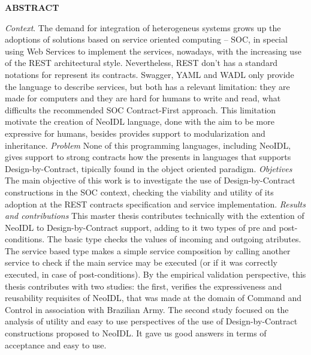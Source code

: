 \noindent
{\large {\bf ABSTRACT}}

\vspace{5mm}
 
\vspace{5mm} 





\emph{Context}. The demand for integration of heterogeneus systems grows up the
adoptions of solutions based on service oriented computing -- SOC, in special
using Web Services to implement the services, nowadays, with the increasing use
of the REST architectural style. Nevertheless, REST don't has a standard
notations for represent its contracts. Swagger, YAML and WADL only provide the
language to describe services, but both has a relevant limitation: they are made
for computers and they are hard for humans to write and read, what difficults the
recommended SOC Contract-First approach. This limitation motivate the creation of NeoIDL
language, done with the aim to be more expressive for humans, besides
provides support to modularization and inheritance. \emph{Problem} None of this programming languages, including NeoIDL, gives support to strong contracts how the
presents in languages that supports Design-by-Contract, tipically found in the
object oriented paradigm. \emph{Objetives} The main objective of this work is to
investigate the use of Design-by-Contract constructions in the SOC context,
checking the viability and utility of its adoption at the REST contracts
specification and service implementation. \emph{Results and contributions} This
master thesis contributes technically with the extention of NeoIDL to
Design-by-Contract support, adding to it two types of pre and post-conditions.
The basic type checks the values of incoming and outgoing atributes. The
service based type makes a simple service composition by calling another service to
check if the main service may be executed (or if it was correctly executed, in case of
post-conditions). By the empirical validation perspective, this thesis
contributes with two studies: the first, verifies the expressiveness and
reusability requisites of NeoIDL, that was made at the domain of Command and
Control in association with Brazilian Army. The second study focused on the
analysis of utility and easy to use perspectives of the use of 
Design-by-Contract constructions proposed to NeoIDL. It gave us good answers in
terms of acceptance and easy to use.

\clearpage
